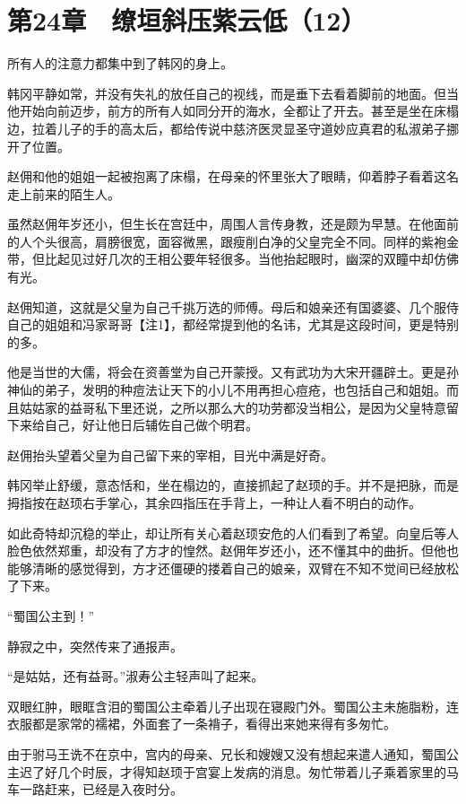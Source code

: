 \section{第24章　缭垣斜压紫云低（12）}

所有人的注意力都集中到了韩冈的身上。

韩冈平静如常，并没有失礼的放任自己的视线，而是垂下去看着脚前的地面。但当他开始向前迈步，前方的所有人如同分开的海水，全都让了开去。甚至是坐在床榻边，拉着儿子的手的高太后，都给传说中慈济医灵显圣守道妙应真君的私淑弟子挪开了位置。

赵佣和他的姐姐一起被抱离了床榻，在母亲的怀里张大了眼睛，仰着脖子看着这名走上前来的陌生人。

虽然赵佣年岁还小，但生长在宫廷中，周围人言传身教，还是颇为早慧。在他面前的人个头很高，肩膀很宽，面容微黑，跟瘦削白净的父皇完全不同。同样的紫袍金带，但比起见过好几次的王相公要年轻很多。当他抬起眼时，幽深的双瞳中却仿佛有光。

赵佣知道，这就是父皇为自己千挑万选的师傅。母后和娘亲还有国婆婆、几个服侍自己的姐姐和冯家哥哥【注1】，都经常提到他的名讳，尤其是这段时间，更是特别的多。

他是当世的大儒，将会在资善堂为自己开蒙授。又有武功为大宋开疆辟土。更是孙神仙的弟子，发明的种痘法让天下的小儿不用再担心痘疮，也包括自己和姐姐。而且姑姑家的益哥私下里还说，之所以那么大的功劳都没当相公，是因为父皇特意留下来给自己，好让他日后辅佐自己做个明君。

赵佣抬头望着父皇为自己留下来的宰相，目光中满是好奇。

韩冈举止舒缓，意态恬和，坐在榻边的，直接抓起了赵顼的手。并不是把脉，而是拇指按在赵顼右手掌心，其余四指压在手背上，一种让人看不明白的动作。

如此奇特却沉稳的举止，却让所有关心着赵顼安危的人们看到了希望。向皇后等人脸色依然郑重，却没有了方才的惶然。赵佣年岁还小，还不懂其中的曲折。但他也能够清晰的感觉得到，方才还僵硬的搂着自己的娘亲，双臂在不知不觉间已经放松了下来。

“蜀国公主到！”

静寂之中，突然传来了通报声。

“是姑姑，还有益哥。”淑寿公主轻声叫了起来。

双眼红肿，眼眶含泪的蜀国公主牵着儿子出现在寝殿门外。蜀国公主未施脂粉，连衣服都是家常的襦裙，外面套了一条褙子，看得出来她来得有多匆忙。

由于驸马王诜不在京中，宫内的母亲、兄长和嫂嫂又没有想起来遣人通知，蜀国公主迟了好几个时辰，才得知赵顼于宫宴上发病的消息。匆忙带着儿子乘着家里的马车一路赶来，已经是入夜时分。

